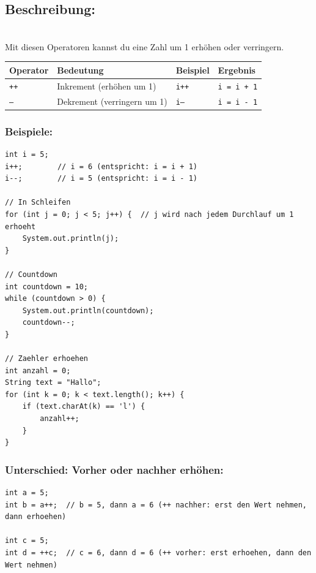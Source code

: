 \subsection*{Beschreibung:}\\
Mit diesen Operatoren kannst du eine Zahl um 1 erhöhen oder verringern.

\begin{center}
	\begin{tabular}{|l|l|l|l|}
		\hline
		\textbf{Operator} & \textbf{Bedeutung} & \textbf{Beispiel} & \textbf{Ergebnis} \\
		\hline
		\texttt{++} & Inkrement (erhöhen um 1) & \texttt{i++} & \texttt{i = i + 1} \\
		\hline
		\texttt{--} & Dekrement (verringern um 1) & \texttt{i--} & \texttt{i = i - 1} \\
		\hline
	\end{tabular}
\end{center}

\subsubsection*{Beispiele:}
\begin{lstlisting}
int i = 5;
i++;        // i = 6 (entspricht: i = i + 1)
i--;        // i = 5 (entspricht: i = i - 1)

// In Schleifen
for (int j = 0; j < 5; j++) {  // j wird nach jedem Durchlauf um 1 erhoeht
    System.out.println(j);
}

// Countdown
int countdown = 10;
while (countdown > 0) {
    System.out.println(countdown);
    countdown--;
}

// Zaehler erhoehen
int anzahl = 0;
String text = "Hallo";
for (int k = 0; k < text.length(); k++) {
    if (text.charAt(k) == 'l') {
        anzahl++;
    }
}
\end{lstlisting}

\subsubsection*{Unterschied: Vorher oder nachher erhöhen:}
\begin{lstlisting}
int a = 5;
int b = a++;  // b = 5, dann a = 6 (++ nachher: erst den Wert nehmen, dann erhoehen)

int c = 5;
int d = ++c;  // c = 6, dann d = 6 (++ vorher: erst erhoehen, dann den Wert nehmen)
\end{lstlisting}

\newpage



